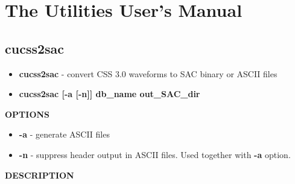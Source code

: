 \section{The Utilities User's Manual}
\subsection{cucss2sac}
\vred
\begin{itemize}
\vred
\item[]{\bf cucss2sac} - convert CSS 3.0 waveforms to SAC binary or ASCII files
\vred
\end{itemize}
\vred
{}
\vred
\begin{itemize}
\vred
\item[] {\bf cucss2sac [-a [-n]] db\_name out\_SAC\_dir}
\vred
\end{itemize}
\vred
{\bf OPTIONS}
\vred
\begin{itemize}
\vred
\item[]    {\bf -a} - generate ASCII files
\vred
\item[]    {\bf -n} - suppress header output in ASCII files. Used together with {\bf -a} option.
\vred
\end{itemize}
\vred
{\bf DESCRIPTION}
\vred

